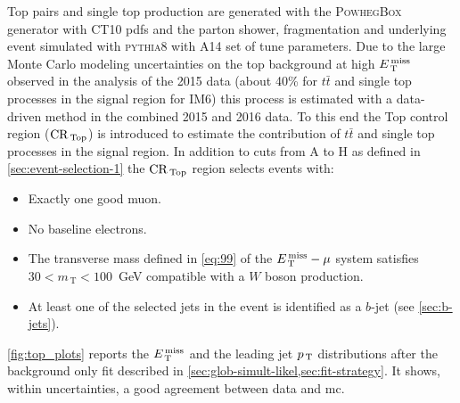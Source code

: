 Top pairs and single top production are generated with the
\textsc{PowhegBox}~\cite{POWHEG} generator with CT10 \glspl{pdf} and the parton
shower, fragmentation and underlying event simulated with \textsc{pythia8} with
A14 set of tune parameters. Due to the large Monte Carlo modeling uncertainties
on the top background at high $E_\mathrm{\, T}^\mathrm{\, miss}$ observed in the analysis of the 2015 data
(about 40\% for $t \bar{t}$ and single top processes in the signal region for
IM6) this process is estimated with a data-driven method in the combined 2015
and 2016 data. To this end the Top control region ($\mathrm{CR}_\mathrm{\, Top}$) is introduced to
estimate the contribution of $t \bar{t}$ and single top processes in the signal
region. In addition to cuts from A to H as defined in
\cref{sec:event-selection-1} the $\mathrm{CR}_\mathrm{\, Top}$ region selects events with:
\begin{itemize}
\item Exactly one good muon.
\item No baseline electrons.
\item The transverse mass defined in \eqref{eq:99} of the $E_\mathrm{\, T}^\mathrm{\, miss} - \mu$ system
  satisfies $30 < m_\mathrm{\, T} < 100$~GeV compatible with a $W$ boson
  production.
\item At least one of the selected jets in the event is identified as a $b$-jet
  (see \cref{sec:b-jets}).
\end{itemize}
\cref{fig:top_plots}
reports the $E_\mathrm{\, T}^\mathrm{\, miss}$ and the leading jet $p_\mathrm{\, T}$ distributions
after the background only fit described in
\cref{sec:glob-simult-likel,sec:fit-strategy}. It shows, within uncertainties, a
good agreement between data and \gls{mc}.
